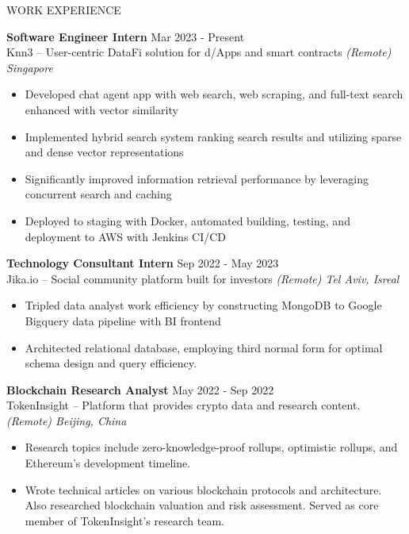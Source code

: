 \documentclass{cv} %
\begin{document}
\begin{rSection}{WORK EXPERIENCE}

	\textbf{Software Engineer Intern} \hfill Mar 2023 - Present\\
	Knn3 – User-centric DataFi solution for d/Apps and smart contracts  \hfill \textit{(Remote) Singapore}
	\begin{itemize}
		\item Developed chat agent app with web search, web scraping, and full-text search enhanced with vector similarity
		\item Implemented hybrid search system ranking search results and utilizing sparse and dense vector representations
		\item Significantly improved information retrieval performance by leveraging concurrent search and caching
		\item Deployed to staging with Docker, automated building, testing, and deployment to AWS with Jenkins CI/CD
	\end{itemize}

	\textbf{Technology Consultant Intern} \hfill Sep 2022 - May 2023\\
	Jika.io – Social community platform built for investors \hfill \textit{(Remote) Tel Aviv, Isreal}
	\begin{itemize}
		\item Tripled data analyst work efficiency by constructing MongoDB to Google Bigquery data pipeline with BI frontend
		\item Architected relational database, employing third normal form for optimal schema design and query efficiency.
	\end{itemize}

	\textbf{Blockchain Research Analyst} \hfill May 2022 - Sep 2022 \\
	TokenInsight – Platform that provides crypto data and research content. \hfill \textit{(Remote) Beijing, China}
	\begin{itemize}
		\item Research topics include zero-knowledge-proof rollups, optimistic rollups, and Ethereum’s development timeline.
		\item Wrote technical articles on various blockchain protocols and architecture. Also researched blockchain valuation and risk assessment. Served as core member of TokenInsight’s research team.
	\end{itemize}

\end{rSection}
\end{document}
